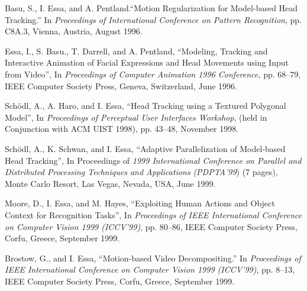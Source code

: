 \begin{pub}
\item Basu, S., I. Essa, and A. Pentland.``Motion Regularization for Model-based Head
Tracking.'' In \textit{Proceedings of International Conference on
Pattern Recognition}, pp. C8A.3, Vienna, Austria, August 1996.
 \label{pub:headtrack-icpr96}

\item Essa, I., S. Basu., T. Darrell, and A. Pentland, ``Modeling, Tracking and Interactive Animation of
Facial Expressions and Head Movements using Input from Video'', In
\textit{Proceedings of Computer Animation 1996 Conference,} pp.
68--79, IEEE Computer Society Press, Geneva, Switzerland, June
1996. \label{pub:faces-ca96}

\item Sch\"{o}dl, A., A. Haro, and I. Essa, ``Head Tracking using a Textured
Polygonal Model'', In \textit{Proceedings of Perceptual User
Interfaces Workshop}, (held in Conjunction with ACM UIST 1998),
pp. 43--48,  November 1998. \label{pub:headtrack-pui98}

\item Sch\"{o}dl, A., K. Schwan, and I. Essa, ``Adaptive Parallelization of
Model-based Head Tracking'', In Proceedings of \textit{1999
International Conference on Parallel and Distributed Processing
Techniques and Applications} \textit{(PDPTA'99}) (7 pages), Monte
Carlo Resort, Las Vegas, Nevada, USA, June 1999.
\label{pub:headtrack-pdpta99}

\item Moore, D., I. Essa, and M. Hayes, ``Exploiting Human Actions and Object
Context for Recognition Tasks'', In \textit{Proceedings of IEEE
International Conference on Computer Vision 1999 (ICCV'99)}, pp.
80--86, IEEE Computer Society Press, Corfu, Greece, September
1999.  \label{pub:actions-iccv99}

\item Brostow, G., and I. Essa, ``Motion-based Video Decompositing.'' In
\textit{Proceedings of IEEE International Conference on Computer
Vision 1999 (ICCV'99)}, pp. 8--13, IEEE Computer Society Press,
Corfu, Greece, September
 1999.
 \label{pub:layers-iccv99}


\end{pub}
